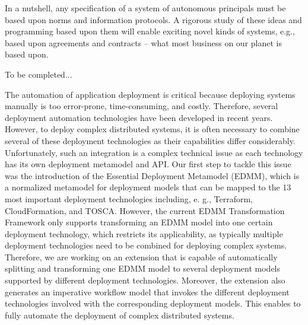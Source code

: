 \documentclass[a4paper,UKenglish]{dagrep-v2018}
\begin{document}
In a nutshell, any specification of a system of autonomous principals must be based upon norms and information protocols.  A rigorous study of these ideas and programming based upon them will enable exciting novel kinds of systems, e.g., based upon agreements and contracts -- what most business on our planet is based upon.


\license

To be completed...


\license

The automation of application deployment is critical because deploying systems manually is too error-prone, time-consuming, and costly. Therefore, several deployment automation technologies have been developed in recent years. However, to deploy complex distributed systems, it is often necessary to combine several of these deployment technologies as their capabilities differ considerably. Unfortunately, such an integration is a complex technical issue as each technology has its own deployment metamodel and API. Our first step to tackle this issue was the introduction of the Essential Deployment Metamodel (EDMM), which is a normalized metamodel for deployment models that can be mapped to the 13 most important deployment technologies including, e. g., Terraform, CloudFormation, and TOSCA. However, the current EDMM Transformation Framework only supports transforming an EDMM model into one certain deployment technology, which restricts its applicability, as typically multiple deployment technologies need to be combined for deploying complex systems. Therefore, we are working on an extension that is capable of automatically splitting and transforming one EDMM model to several  deployment models supported by different deployment technologies. Moreover, the extension also generates an imperative workflow model that invokes the different deployment technologies involved with the corresponding deployment models. This enables to fully automate the deployment of complex distributed systems.

\end{document}
